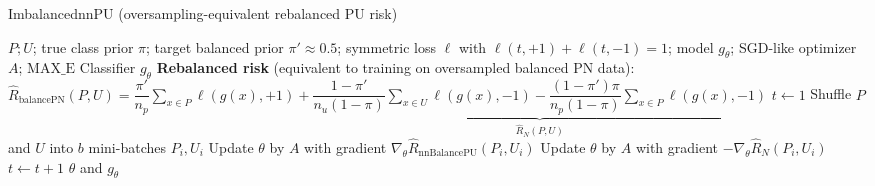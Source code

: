 \documentclass{article}
\begin{document}
\begin{algorithm}[!h]
\renewcommand{\algorithmicrequire}{\textbf{Input:}} %
\renewcommand{\algorithmicensure}{\textbf{Output:}} %
	\caption{ImbalancednnPU (oversampling-equivalent rebalanced PU risk)} %
	\begin{algorithmic}[1] %
	    \REQUIRE
	    $P;U$; true class prior $\pi$; target balanced prior $\pi'\approx 0.5$;
	    symmetric loss $\ell$ with $\ell(t,+1)+\ell(t,-1)=1$; model $g_{\theta}$;
	    SGD-like optimizer $A$; $\mathrm{MAX\_E}$
	    \ENSURE
	    Classifier $g_{\theta}$
	    \STATE \textbf{Rebalanced risk} (equivalent to training on oversampled balanced PN data):
	    \STATE \quad $\hat{R}_{\mathrm{balancePN}}(P,U)=\dfrac{\pi'}{n_{p}}\sum_{x\in P}\ell(g(x),+1)
	    +\underbrace{\dfrac{1-\pi'}{n_{u}(1-\pi)}\sum_{x\in U}\ell(g(x),-1)
	    -\dfrac{(1-\pi')\pi}{n_{p}(1-\pi)}\sum_{x\in P}\ell(g(x),-1)}_{\hat{R}_{N}(P,U)}$ %
	    \STATE $t\leftarrow 1$
	    \STATE Shuffle $P$ and $U$ into $b$ mini-batches $P_{i},U_{i}$
	    \STATE Update $\theta$ by $A$ with gradient $\nabla_{\theta}\hat{R}_{\mathrm{nnBalancePU}}(P_{i},U_{i})$ %
	    \ELSE
	    \STATE Update $\theta$ by $A$ with gradient $-\nabla_{\theta}\hat{R}_{N}(P_{i},U_{i})$ %
	    \ENDIF
	    \ENDFOR
	    \STATE $t\leftarrow t+1$
	    \ENDWHILE
		\RETURN $\theta$ and $g_{\theta}$
	\end{algorithmic}
\end{algorithm}
\end{document}
